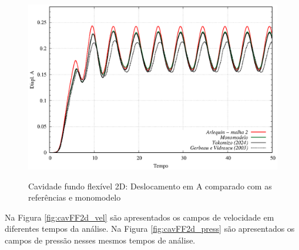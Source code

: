 \begin{figure}[!htbp]
	\caption{Cavidade fundo flexível 2D: Deslocamento em A comparado com as referências e monomodelo}
	\centering 
	\includegraphics[scale=1.0,trim=0cm 0cm 0cm 0cm, clip=true]{Imagens/Cap7/cavFF2d_deslA.eps}	
	\label{fig:cavFF2d_deslA}
\end{figure}

Na Figura \ref{fig:cavFF2d_vel} são apresentados os campos de velocidade em diferentes tempos da análise. Na Figura \ref{fig:cavFF2d_press} são apresentados os campos de pressão nesses mesmos tempos de análise.

